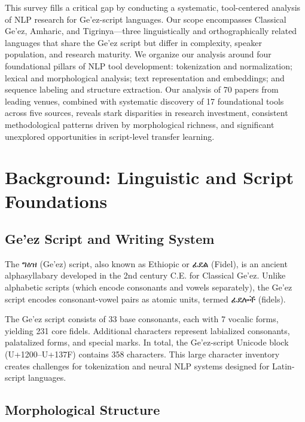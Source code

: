 \documentclass[12pt,a4paper]{article}
\theoremstyle{plain}
\theoremstyle{definition}
\begin{document}
This survey fills a critical gap by conducting a systematic, tool-centered analysis of NLP research for Ge'ez-script languages. Our scope encompasses Classical Ge'ez, Amharic, and Tigrinya---three linguistically and orthographically related languages that share the Ge'ez script but differ in complexity, speaker population, and research maturity. We organize our analysis around four foundational pillars of NLP tool development: tokenization and normalization; lexical and morphological analysis; text representation and embeddings; and sequence labeling and structure extraction. Our analysis of 70 papers from leading venues, combined with systematic discovery of 17 foundational tools across five sources, reveals stark disparities in research investment, consistent methodological patterns driven by morphological richness, and significant unexplored opportunities in script-level transfer learning.


\section{Background: Linguistic and Script Foundations}
\label{sec:background}

\subsection{Ge'ez Script and Writing System}

The {\geezfont ግዕዝ} (Ge'ez) script, also known as Ethiopic or {\geezfont ፊደል} (Fidel), is an ancient alphasyllabary developed in the 2nd century C.E. for Classical Ge'ez. Unlike alphabetic scripts (which encode consonants and vowels separately), the Ge'ez script encodes consonant-vowel pairs as atomic units, termed {\geezfont ፊደሎች} (fidels).

The Ge'ez script consists of 33 base consonants, each with 7 vocalic forms, yielding 231 core fidels. Additional characters represent labialized consonants, palatalized forms, and special marks. In total, the Ge'ez-script Unicode block (U+1200--U+137F) contains 358 characters. This large character inventory creates challenges for tokenization and neural NLP systems designed for Latin-script languages.

\subsection{Morphological Structure}
\end{document}
